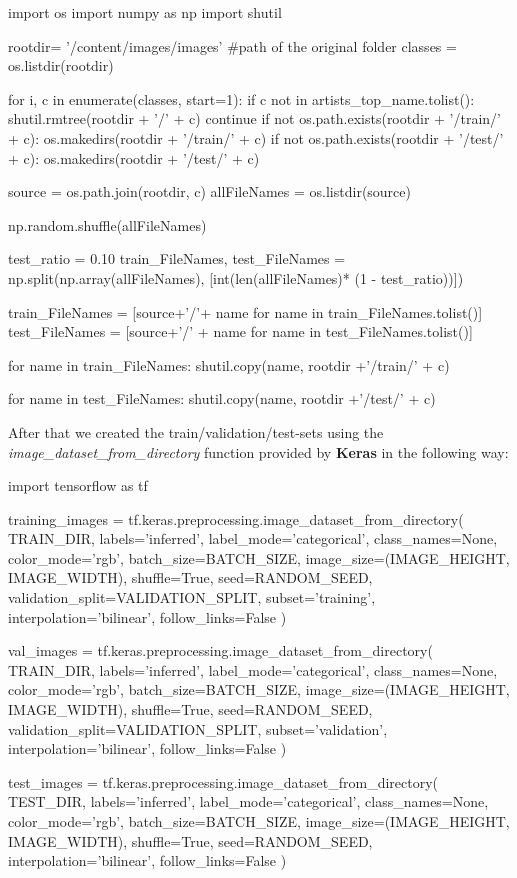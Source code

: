 \begin{python}
import os
import numpy as np
import shutil

rootdir= '/content/images/images' #path of the original folder
classes = os.listdir(rootdir)

for i, c in enumerate(classes, start=1):
  if c not in artists_top_name.tolist():
    shutil.rmtree(rootdir + '/' + c)
    continue
  if not os.path.exists(rootdir + '/train/' + c):
    os.makedirs(rootdir + '/train/' + c)
  if not os.path.exists(rootdir + '/test/' + c):  
    os.makedirs(rootdir + '/test/' + c)

  source = os.path.join(rootdir, c)
  allFileNames = os.listdir(source)

  np.random.shuffle(allFileNames)

  test_ratio = 0.10
  train_FileNames, test_FileNames = np.split(np.array(allFileNames),
                                                        [int(len(allFileNames)* (1 - test_ratio))])

  train_FileNames = [source+'/'+ name for name in train_FileNames.tolist()]
  test_FileNames = [source+'/' + name for name in test_FileNames.tolist()]

  for name in train_FileNames:
    shutil.copy(name, rootdir +'/train/' + c)

  for name in test_FileNames:
    shutil.copy(name, rootdir +'/test/' + c)
\end{python}

After that we created the train/validation/test-sets using the \textit{image\_dataset\_from\_directory} function provided by \textbf{Keras} in the following way:

\begin{python}
import tensorflow as tf

training_images = tf.keras.preprocessing.image_dataset_from_directory(
    TRAIN_DIR, labels='inferred', label_mode='categorical',
    class_names=None, color_mode='rgb', batch_size=BATCH_SIZE, 
    image_size=(IMAGE_HEIGHT,  IMAGE_WIDTH), shuffle=True, seed=RANDOM_SEED, 
    validation_split=VALIDATION_SPLIT, subset='training',
    interpolation='bilinear', follow_links=False
)

val_images = tf.keras.preprocessing.image_dataset_from_directory(
    TRAIN_DIR, labels='inferred', label_mode='categorical',
    class_names=None, color_mode='rgb', batch_size=BATCH_SIZE,
    image_size=(IMAGE_HEIGHT, IMAGE_WIDTH), shuffle=True, seed=RANDOM_SEED,
    validation_split=VALIDATION_SPLIT, subset='validation',
    interpolation='bilinear', follow_links=False
)

test_images = tf.keras.preprocessing.image_dataset_from_directory(
    TEST_DIR, labels='inferred', label_mode='categorical',
    class_names=None, color_mode='rgb', batch_size=BATCH_SIZE, 
    image_size=(IMAGE_HEIGHT, IMAGE_WIDTH), shuffle=True, seed=RANDOM_SEED,
    interpolation='bilinear', follow_links=False
)
\end{python}

